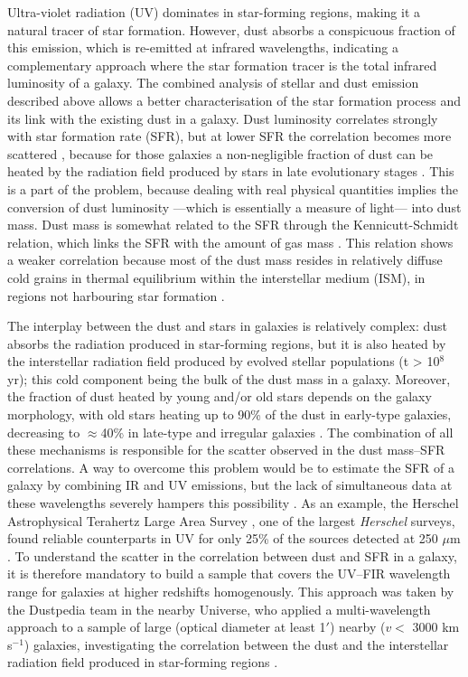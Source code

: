 \documentclass{aa}
\begin{document}
Ultra-violet radiation (UV) dominates in star-forming regions, making it a natural tracer of star formation. However, dust absorbs a conspicuous fraction of this emission, which is re-emitted at infrared wavelengths, indicating a complementary approach where the star formation tracer is the total infrared luminosity of a galaxy. The combined analysis of stellar and dust emission described above allows a better characterisation of the star formation process and its link with the existing dust in a galaxy. Dust luminosity correlates strongly with star formation rate (SFR), but at lower SFR the correlation becomes more scattered \citep{cal2,cle,pap2}, because for those galaxies a non-negligible fraction of dust can be heated by the radiation field produced by stars in late evolutionary stages \citep{lon, ben,ben2,ben3,via2, via}. This is a part of the problem, because dealing with real physical quantities implies the conversion of dust luminosity ---which is essentially a measure of light--- into dust mass. Dust mass is somewhat related to the SFR through the Kennicutt-Schmidt relation, which links the SFR with the amount of gas mass \citep{boq3,ben2}. This relation shows a weaker correlation because most of the dust mass resides in relatively diffuse cold grains in thermal equilibrium within the interstellar medium (ISM), in regions not harbouring star formation \citep{smi,cle,pap2,boq2}. 

The interplay between the dust and stars in galaxies is relatively complex: dust absorbs the radiation produced in star-forming regions, but it is also heated by the interstellar radiation field produced by evolved stellar populations (t > 10$^8$ yr); this cold component being the bulk of the dust mass in a galaxy. Moreover, the fraction of dust heated by young and/or old stars depends on the galaxy morphology, with old stars heating up to 90\% of the dust in early-type galaxies, decreasing to $\approx$40\% in late-type and irregular galaxies \citep{ner}. The combination of all these mechanisms is responsible for the scatter observed in the dust mass--SFR correlations. A way to overcome this problem would be to estimate the SFR of a galaxy by combining IR and UV emissions, but the lack of simultaneous data at these wavelengths severely hampers this possibility \citep{ilb}. As an example, the Herschel Astrophysical Terahertz Large Area Survey \citep[H-ATLAS]{eal}, one of the largest {\it Herschel} surveys, found reliable counterparts in UV  for only 25\% of the sources detected at 250 $\mu$m \citep{bou}. To understand the scatter in the correlation between dust and SFR in a galaxy, it is therefore mandatory to build a sample that  covers  the UV--FIR wavelength range for galaxies at higher redshifts homogenously. This approach was taken by the Dustpedia team \citep{dav3}  in the nearby Universe, who applied a multi-wavelength approach to a sample of large (optical diameter
at least 1$'$) nearby ($v <$ 3000 km s$^{-1}$)  galaxies, investigating the correlation between the dust and the interstellar radiation field produced in star-forming regions \citep[see e.g.][]{bia2,bia3,ner}.
\end{document}

